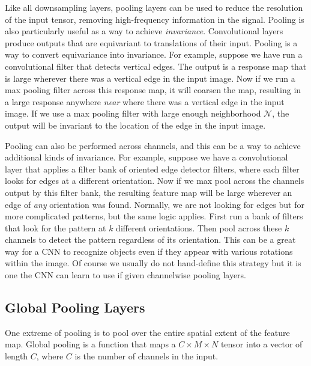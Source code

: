 Like all downsampling layers, pooling layers can be used to reduce the resolution of the input tensor, removing high-frequency information in the signal. Pooling is also particularly useful as a way to achieve \textit{invariance}. Convolutional layers produce outputs that are equivariant to translations of their input. Pooling is a way to convert equivariance into invariance. For example, suppose we have run a convolutional filter that detects vertical edges. The output is a response map that is large wherever there was a vertical edge in the input image. Now if we run a max pooling filter across this response map, it will coarsen the map, resulting in a large response anywhere \textit{near} where there was a vertical edge in the input image. If we use a max pooling filter with large enough neighborhood $\mathcal{N}$, the output will be invariant to the location of the edge in the input image.

Pooling can also be performed across channels, and this can be a way to achieve additional kinds of invariance. For example, suppose we have a convolutional layer that applies a filter bank of oriented edge detector filters, where each filter looks for edges at a different orientation. Now if we max pool across the channels output by this filter bank, the resulting feature map will be large wherever an edge of \textit{any} orientation was found. Normally, we are not looking for edges but for more complicated patterns, but the same logic applies. First run a bank of filters that look for the pattern at $k$ different orientations. Then pool across these $k$ channels to detect the pattern regardless of its orientation. This can be a great way for a CNN to recognize objects even if they appear with various rotations within the image. Of course we usually do not hand-define this strategy but it is one the CNN can learn to use if given channelwise pooling layers.



\subsection{Global Pooling Layers}

One extreme of pooling is to pool over the entire spatial extent of the feature map. Global pooling is a function that maps a $C \times M \times N$ tensor into a vector of length $C$, where $C$ is the number of channels in the input.

